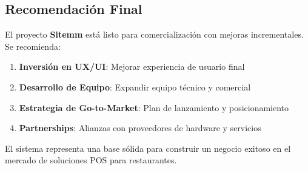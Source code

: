 \documentclass[12pt,a4paper]{article}
\begin{document}
\subsection{Recomendación Final}

El proyecto \textbf{Sitemm} está listo para comercialización con mejoras incrementales. Se recomienda:

\begin{enumerate}
    \item \textbf{Inversión en UX/UI}: Mejorar experiencia de usuario final
    \item \textbf{Desarrollo de Equipo}: Expandir equipo técnico y comercial
    \item \textbf{Estrategia de Go-to-Market}: Plan de lanzamiento y posicionamiento
    \item \textbf{Partnerships}: Alianzas con proveedores de hardware y servicios
\end{enumerate}

El sistema representa una base sólida para construir un negocio exitoso en el mercado de soluciones POS para restaurantes.
\end{document}
